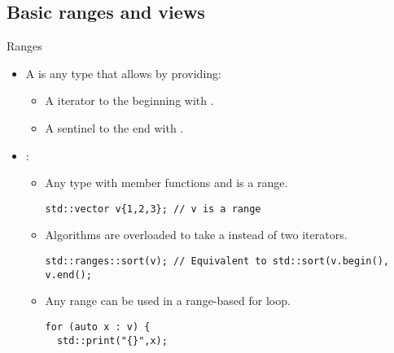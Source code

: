 \subsection{Basic ranges and views}

\begin{frame}[t,fragile]{Ranges}
\begin{itemize}
  \item A  is any type  that allows  by
        providing:
    \begin{itemize}
      \item A iterator to the beginning with .
      \item A sentinel to the end with .
    \end{itemize}

  \item {}:
    \begin{itemize}
      \item Any type with member functions  and  is a
            range.
\begin{lstlisting}
std::vector v{1,2,3}; // v is a range
\end{lstlisting}

      \pause
      \item Algorithms are overloaded to take a  instead of two
            iterators.
\begin{lstlisting}
std::ranges::sort(v); // Equivalent to std::sort(v.begin(), v.end();
\end{lstlisting}

      \pause
      \item Any range can be used in a range-based for loop.
\begin{lstlisting}
for (auto x : v) {
  std::print("{}",x);
\end{lstlisting}
    \end{itemize}
\end{itemize}
\end{frame}

